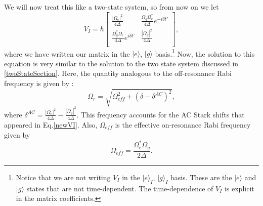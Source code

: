 We will now treat this like a two-state system, so from now on we let 
\begin{equation}
V_I=
\hbar
\begin{bmatrix}
\frac{|\Omega_e|^2}{4\Delta} & \frac{\Omega_g\Omega_e^*}{4\Delta}e^{-i\delta t'}\\
 \frac{\Omega_g^*\Omega_e}{4\Delta}e^{i\delta t'} & \frac{|\Omega_g|^2}{4\Delta}\\
\end{bmatrix},\label{newVI}
\end{equation}
where we have written our matrix in the $|e\rangle$, $|g\rangle$ basis.\footnote{Notice that we are not writing $V_I$ in the $|e\rangle_I$, $|g\rangle_I$ basis. These are the $|e\rangle$ and $|g\rangle$ states that are not time-dependent. The time-dependence of $V_I$ is explicit in the matrix coefficients.}
Now, the solution to this equation is very similar to the solution to the two state system discussed in \ref{twoStateSection}. Here, the quantity analogous to the off-resonance Rabi frequency is given by \cite{Young1997363}: 
\begin{equation}
\Omega_\mathit{r}=\sqrt{\Omega_\mathit{eff}^2+(\delta-\delta^{AC})^2},
\end{equation}
where $\delta^{AC}= \frac{|\Omega_e|^2}{4\Delta}-\frac{|\Omega_g|^2}{4\Delta}$. This frequency accounts for the AC Stark shifts that appeared in Eq.\eqref{newVI}. Also, $\Omega_{\mathit{eff}}$ is the effective on-resonance Rabi frequency given by 
\begin{equation}
\Omega_{\mathit{eff}}=\frac{\Omega_e^*\Omega_g}{2\Delta}.
\end{equation}

